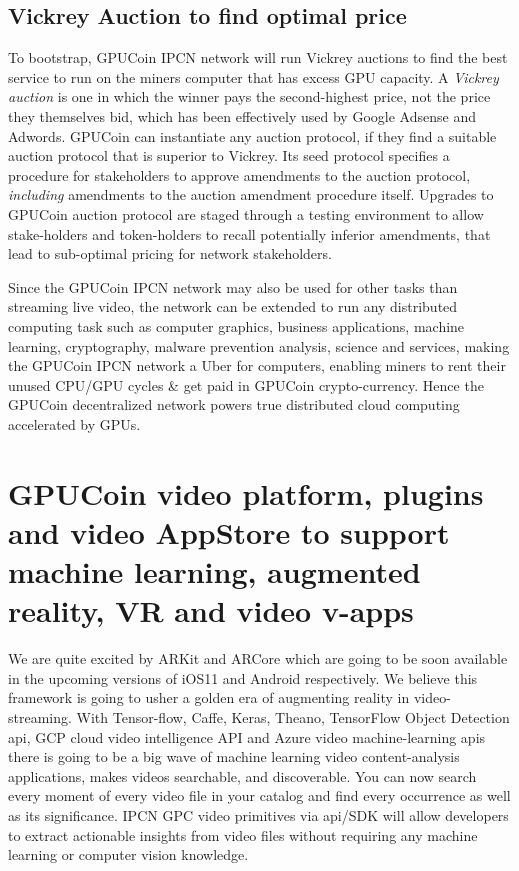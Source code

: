 \documentclass{article}
\begin{document}
\subsection{Vickrey Auction to find optimal price}
To bootstrap, GPUCoin IPCN network will run Vickrey auctions to find the best service to run on the miners computer that has excess GPU capacity. A \emph{Vickrey auction} is one in which the winner pays the second-highest price, not the price they themselves bid, which has been effectively used by Google Adsense and Adwords.
GPUCoin can instantiate any auction protocol, if they find a suitable auction protocol that is superior to Vickrey. Its seed protocol specifies a procedure for stakeholders to approve amendments to the auction protocol, \emph{including} amendments to the auction amendment procedure itself. Upgrades to GPUCoin auction protocol are staged through a testing environment to allow stake-holders and token-holders to recall potentially inferior amendments, that lead to sub-optimal pricing for network stakeholders. 

Since the GPUCoin IPCN network may also be used for other tasks than streaming live video, the network can be extended to run any distributed computing task such as computer graphics, business applications, machine learning, cryptography, malware prevention analysis, science and services, making the GPUCoin IPCN network a Uber for computers, enabling miners to rent their unused CPU/GPU cycles \& get paid in GPUCoin crypto-currency. Hence the GPUCoin decentralized network powers true distributed cloud computing accelerated by GPUs.


\section{GPUCoin video platform, plugins and video AppStore to support machine learning, augmented reality, VR and video v-apps}
We are quite excited by ARKit and ARCore which are going to be soon available in the upcoming versions of iOS11 and Android respectively. We believe this framework is going to usher a golden era of augmenting reality in video-streaming. With Tensor-flow, Caffe, Keras, Theano, TensorFlow Object Detection api, GCP cloud video intelligence API and Azure video machine-learning apis there is going to be a big wave of machine learning video content-analysis applications, makes videos searchable, and discoverable. You can now search every moment of every video file in your catalog and find every occurrence as well as its significance. IPCN GPC video primitives via api/SDK will allow developers to extract actionable insights from video files without requiring any machine learning or computer vision knowledge. 
\end{document}
